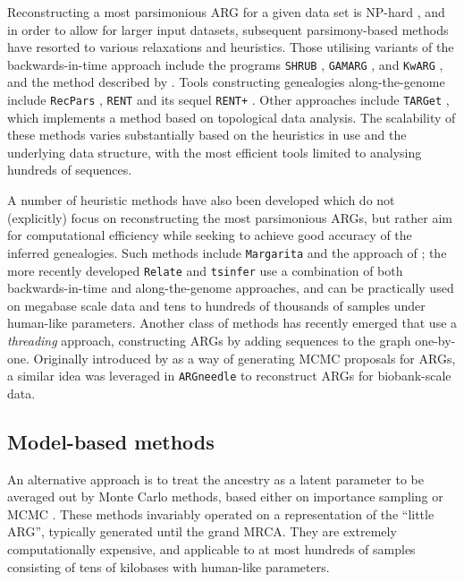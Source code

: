 \documentclass{article}
\begin{document}
Reconstructing a most parsimonious ARG for a given data set is NP-hard \citep{wang2001perfect},
and in order to allow for larger input datasets, subsequent parsimony-based methods have resorted
to various relaxations and heuristics. Those utilising variants of the backwards-in-time approach
include the programs \texttt{SHRUB} \citep{song2005efficient}, \texttt{GAMARG} \citep{thao2019hybrid},
and \texttt{KwARG} \citep{ignatieva2021kwarg}, and the method described by \citet{wu2008association}.
Tools constructing genealogies along-the-genome include \texttt{RecPars} \citep{hein1993heuristic},
\texttt{RENT} \citep{wu2011new} and its sequel \texttt{RENT+} \citep{mirzaei2017rent}. Other approaches
include \texttt{TARGet} \citep{camara2016inference}, which implements a method based on topological
data analysis. The scalability of these methods varies substantially based on the heuristics in use
and the underlying data structure, with the most efficient tools limited to analysing hundreds of
sequences.

A number of heuristic methods have also been developed which do not (explicitly) focus on reconstructing
the most parsimonious ARGs, but rather aim for computational efficiency while seeking to achieve good
accuracy of the inferred genealogies. Such methods include \texttt{Margarita} \citep{minichiello2006mapping}
and the approach of \citet{parida2008estimating}; the more recently developed \texttt{Relate}
\citep{speidel2019method} and \texttt{tsinfer} \citep{kelleher2019inferring} use a combination of both
backwards-in-time and along-the-genome approaches, and can be practically used on megabase scale data
and tens to hundreds of thousands of samples under human-like parameters.
Another class of methods has recently emerged that use a \emph{threading} approach, constructing ARGs
by adding sequences to the graph one-by-one. Originally introduced by \citet{rasmussen2014genome} as a
way of generating MCMC proposals for ARGs, a similar idea was leveraged in \texttt{ARGneedle}
\citep{zhang2021biobank} to reconstruct ARGs for biobank-scale data.

\subsection*{Model-based methods}
An alternative approach is to treat the ancestry as a latent parameter to be averaged out
by Monte Carlo methods, based either on importance sampling
\citep{griffiths1996ancestral, fearnhead2001estimating, jenkins2011inference}
or MCMC \citep{kuhner2000maximum, nielsen2000estimation, wang2008bayesian, fallon2013acg}.
These methods invariably operated on a representation of the ``little ARG'', typically
generated until the grand MRCA. They are extremely computationally expensive,
and applicable to at most hundreds of samples consisting of tens of kilobases with
human-like parameters.
\end{document}
